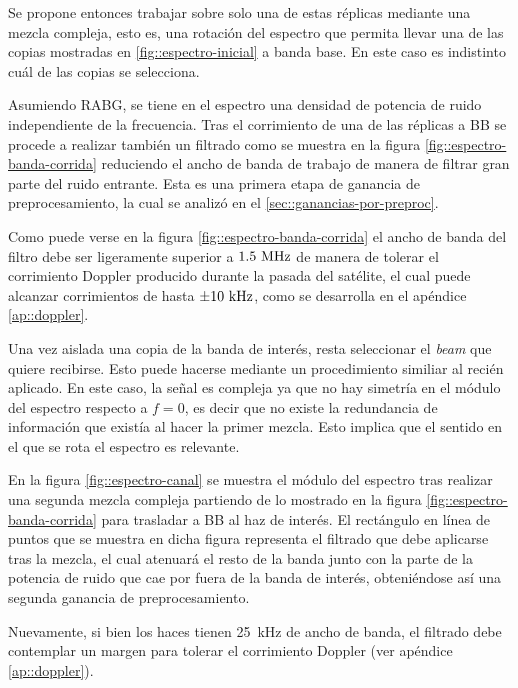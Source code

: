 \documentclass[../../main.tex]{subfiles}
\begin{document}
Se propone entonces trabajar sobre solo una de estas réplicas mediante una mezcla compleja, esto es, una rotación del espectro  que permita llevar una de las copias mostradas en \ref{fig::espectro-inicial} a banda base. En este caso es indistinto cuál de las copias se selecciona. 

Asumiendo RABG, se tiene en el espectro una densidad de potencia de ruido independiente de la frecuencia. 
Tras el corrimiento de una de las réplicas a BB se procede a realizar también un filtrado como se muestra en la figura \ref{fig::espectro-banda-corrida} reduciendo el ancho de banda de trabajo de manera de filtrar gran parte del ruido entrante. Esta es una primera etapa de ganancia de preprocesamiento, la cual se analizó en el \cref{sec::ganancias-por-preproc}. 

Como puede verse en la figura \ref{fig::espectro-banda-corrida} el ancho de banda del filtro debe ser ligeramente superior a $1.5~\textrm{MHz}$ de manera de tolerar el corrimiento Doppler producido durante la pasada del satélite, el cual puede alcanzar corrimientos de hasta $\pm 10~\textrm{kHz}$, como se desarrolla en el apéndice \ref{ap::doppler}.

Una vez aislada una copia de la banda de interés, resta seleccionar el \textit{beam} que quiere recibirse. Esto puede hacerse mediante un procedimiento similiar al recién aplicado. En este caso, la señal es compleja ya que no hay simetría en el módulo del espectro respecto a $f = 0$, es decir que no existe la redundancia de información que existía al hacer la primer mezcla. Esto implica que el sentido en el que se rota el espectro es relevante.

En la figura \ref{fig::espectro-canal} se muestra el módulo del espectro tras realizar una segunda mezcla compleja partiendo de lo mostrado en la figura \ref{fig::espectro-banda-corrida} para trasladar a BB al haz de interés. El rectángulo en línea de puntos que se muestra en dicha figura representa el filtrado que debe aplicarse tras la mezcla, el cual atenuará el resto de la banda junto con la parte de la potencia de ruido que cae por fuera de la banda de interés, obteniéndose así una segunda ganancia de preprocesamiento.

Nuevamente, si bien los haces tienen 25~kHz de ancho de banda, el filtrado debe contemplar un margen para tolerar el corrimiento Doppler (ver apéndice \ref{ap::doppler}).
\end{document}
